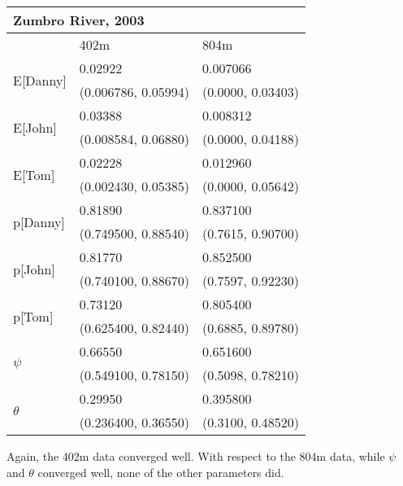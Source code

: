 \documentclass{article}
\begin{document}
    \begin{center}
    \begin{tabular}{|l|l|l|}
        \hline
        \multicolumn{3}{|l|}{\textbf{Zumbro River, 2003}} \\
        \hline
            & 402m & 804m \\
        \hline
        \multirow{2}{*}{E[Danny]}
            & 0.02922 & 0.007066 \\
            & (0.006786, 0.05994) & (0.0000, 0.03403) \\
        \hline
        \multirow{2}{*}{E[John]}
            & 0.03388 & 0.008312 \\
            & (0.008584, 0.06880) & (0.0000, 0.04188) \\
        \hline
        \multirow{2}{*}{E[Tom]}
            & 0.02228 & 0.012960 \\
            & (0.002430, 0.05385) & (0.0000, 0.05642) \\
        \hline
        \multirow{2}{*}{p[Danny]}
            & 0.81890 & 0.837100 \\
            & (0.749500, 0.88540) & (0.7615, 0.90700) \\
        \hline
        \multirow{2}{*}{p[John]}
            & 0.81770 & 0.852500 \\
            & (0.740100, 0.88670) & (0.7597, 0.92230) \\
        \hline
        \multirow{2}{*}{p[Tom]}
            & 0.73120 & 0.805400 \\
            & (0.625400, 0.82440) & (0.6885, 0.89780) \\
        \hline
        \multirow{2}{*}{\(\psi\)}
            & 0.66550 & 0.651600 \\
            & (0.549100, 0.78150) & (0.5098, 0.78210) \\
        \hline
        \multirow{2}{*}{\(\theta\)}
            & 0.29950 & 0.395800 \\
            & (0.236400, 0.36550) & (0.3100, 0.48520) \\
        \hline
    \end{tabular}
    \end{center}

    Again, the 402m data converged well.  With respect to the 804m data, while
    \(\psi\) and \(\theta\) converged well, none of the other parameters did.
\end{document}
